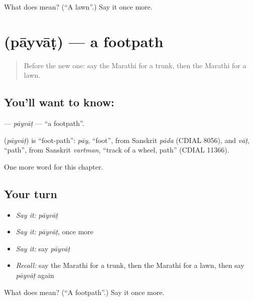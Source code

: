 \begin{tcolorbox}[breakable,colback=teal!4,colframe=teal!35!black,title={Before you move on}]
What does  mean? (\textquotedblleft{}A lawn\textquotedblright{}.) Say it once more.
\end{tcolorbox}
\section[\texorpdfstring{\mr{पायवाट} (pāyvāṭ)}{पायवाट (pāyvāṭ)}]{ (pāyvāṭ) — a footpath}

\label{lesson:MR-C241-payvat}



\begin{quote}
Before the new one: say the Marathi for a trunk, then the Marathi for a lawn.
\end{quote}

\subsection*{You'll want to know: }
\textbf{} — \emph{pāyvāṭ} — \textquotedblleft{}a footpath\textquotedblright{}.

\begin{cousinweb}
\textbf{} (\emph{pāyvāṭ}) is \textquotedblleft{}foot-path\textquotedblright{}: \emph{pāy}, \textquotedblleft{}foot\textquotedblright{}, from Sanskrit \emph{pāda} (CDIAL 8056), and \emph{vāṭ}, \textquotedblleft{}path\textquotedblright{}, from Sanskrit \emph{vartman}, \textquotedblleft{}track of a wheel, path\textquotedblright{} (CDIAL 11366).
\end{cousinweb}

\begin{grammarlens}[title={What you've built}]
One more word for this chapter.
\end{grammarlens}

\subsection*{Your turn}
\begin{itemize}
\raggedright
  \item \emph{Say it:} \emph{pāyvāṭ}
  \item \emph{Say it:} \emph{pāyvāṭ}, once more
  \item \emph{Say it:} say \emph{pāyvāṭ}
  \item \emph{Recall:} say the Marathi for a trunk, then the Marathi for a lawn, then say \emph{pāyvāṭ} again
\end{itemize}

\begin{tcolorbox}[breakable,colback=teal!4,colframe=teal!35!black,title={Before you move on}]
What does  mean? (\textquotedblleft{}A footpath\textquotedblright{}.) Say it once more.
\end{tcolorbox}
